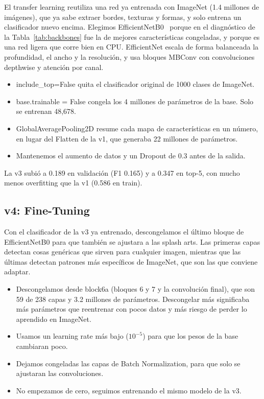 \documentclass[10pt,twocolumn]{article}
\begin{document}
El transfer learning reutiliza una red ya entrenada con ImageNet (1.4 millones de imágenes), que ya sabe extraer bordes, texturas y formas, y solo entrena un clasificador nuevo encima. Elegimos EfficientNetB0~\cite{efficientnet} porque en el diagnóstico de la Tabla~\ref{tab:backbones} fue la de mejores características congeladas, y porque es una red ligera que corre bien en CPU. EfficientNet escala de forma balanceada la profundidad, el ancho y la resolución, y usa bloques MBConv con convoluciones depthwise y atención por canal.

\begin{itemize}
  \item include\_top=False quita el clasificador original de 1000 clases de ImageNet.
  \item base.trainable = False congela los 4 millones de parámetros de la base. Solo se entrenan 48,678.
  \item GlobalAveragePooling2D resume cada mapa de características en un número, en lugar del Flatten de la v1, que generaba 22 millones de parámetros.
  \item Mantenemos el aumento de datos y un Dropout de 0.3 antes de la salida.
\end{itemize}

La v3 subió a 0.189 en validación (F1 0.165) y a 0.347 en top-5, con mucho menos overfitting que la v1 (0.586 en train).

\subsection{v4: Fine-Tuning}

Con el clasificador de la v3 ya entrenado, descongelamos el último bloque de EfficientNetB0 para que también se ajustara a las splash arts. Las primeras capas detectan cosas genéricas que sirven para cualquier imagen, mientras que las últimas detectan patrones más específicos de ImageNet, que son las que conviene adaptar.

\begin{itemize}
  \item Descongelamos desde block6a (bloques 6 y 7 y la convolución final), que son 59 de 238 capas y 3.2 millones de parámetros. Descongelar más significaba más parámetros que reentrenar con pocos datos y más riesgo de perder lo aprendido en ImageNet.
  \item Usamos un learning rate más bajo ($10^{-5}$) para que los pesos de la base cambiaran poco.
  \item Dejamos congeladas las capas de Batch Normalization, para que solo se ajustaran las convoluciones.
  \item No empezamos de cero, seguimos entrenando el mismo modelo de la v3.
\end{itemize}
\end{document}
